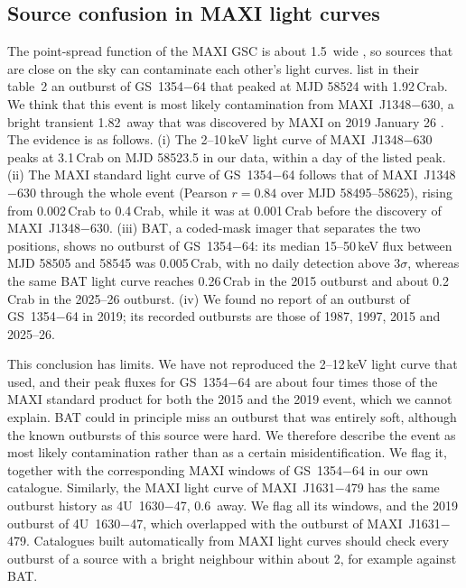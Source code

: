 \documentclass[fleqn,usenatbib]{mnras}
\begin{document}
\subsection{Source confusion in MAXI light curves}
\label{sec:confusion}

The point-spread function of the MAXI GSC is about 1.5\degr\ wide \citep{Mihara2011}, so sources that are close on the sky can contaminate each other's light curves. \citet{Saraswati2025} list in their table~2 an outburst of GS~1354$-$64 that peaked at MJD 58524 with 1.92\,Crab. We think that this event is most likely contamination from MAXI~J1348$-$630, a bright transient 1.82\degr\ away that was discovered by MAXI on 2019 January 26 \citep{Tominaga2020}. The evidence is as follows. (i) The 2--10\,keV light curve of MAXI~J1348$-$630 peaks at 3.1\,Crab on MJD 58523.5 in our data, within a day of the listed peak. (ii) The MAXI standard light curve of GS~1354$-$64 follows that of MAXI~J1348$-$630 through the whole event (Pearson $r=0.84$ over MJD 58495--58625), rising from 0.002\,Crab to 0.4\,Crab, while it was at 0.001\,Crab before the discovery of MAXI~J1348$-$630. (iii) BAT, a coded-mask imager that separates the two positions, shows no outburst of GS~1354$-$64: its median 15--50\,keV flux between MJD 58505 and 58545 was 0.005\,Crab, with no daily detection above $3\sigma$, whereas the same BAT light curve reaches 0.26\,Crab in the 2015 outburst and about 0.2\,Crab in the 2025--26 outburst. (iv) We found no report of an outburst of GS~1354$-$64 in 2019; its recorded outbursts are those of 1987, 1997, 2015 and 2025--26.

This conclusion has limits. We have not reproduced the 2--12\,keV light curve that \citet{Saraswati2025} used, and their peak fluxes for GS~1354$-$64 are about four times those of the MAXI standard product for both the 2015 and the 2019 event, which we cannot explain. BAT could in principle miss an outburst that was entirely soft, although the known outbursts of this source were hard. We therefore describe the event as most likely contamination rather than as a certain misidentification. We flag it, together with the corresponding MAXI windows of GS~1354$-$64 in our own catalogue. Similarly, the MAXI light curve of MAXI~J1631$-$479 has the same outburst history as 4U~1630$-$47, 0.6\degr\ away. We flag all its windows, and the 2019 outburst of 4U~1630$-$47, which overlapped with the outburst of MAXI~J1631$-$479. Catalogues built automatically from MAXI light curves should check every outburst of a source with a bright neighbour within about 2\degr, for example against BAT.
\end{document}
